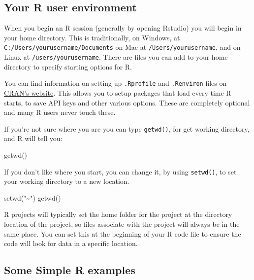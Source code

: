 \documentclass[
]{article}
\newenvironment{Shaded}{\begin{snugshade}}{\end{snugshade}}
\newcommand{\FunctionTok}[1]{\textcolor[rgb]{0.00,0.00,0.00}{#1}}
\newcommand{\NormalTok}[1]{#1}
\newcommand{\StringTok}[1]{\textcolor[rgb]{0.31,0.60,0.02}{#1}}
\begin{document}
\hypertarget{your-r-user-environment}{%
\subsection{Your R user environment}\label{your-r-user-environment}}

When you begin an R session (generally by opening Rstudio) you will
begin in your home directory. This is traditionally, on Windows, at
\texttt{\textquotesingle{}C:/Users/yourusername/Documents\textquotesingle{}} on Mac at \texttt{\textquotesingle{}/Users/yourusername\textquotesingle{}},
and on Linux at \texttt{\textquotesingle{}/users/yourusername\textquotesingle{}}. There are files you can add to
your home directory to specify starting options for R.

You can find information on setting up \texttt{.Rprofile} and \texttt{.Renviron} files
on \href{https://cran.r-project.org/web/packages/startup/vignettes/startup-intro.html}{CRAN's
website}.
This allows you to setup packages that load every time R starts, to save
API keys and other various options. These are completely optional and
many R users never touch these.

If you're not sure where you are you can type \texttt{getwd()}, for get working
directory, and R will tell you:

\begin{Shaded}
\begin{Highlighting}[]
\FunctionTok{getwd}\NormalTok{()}
\end{Highlighting}
\end{Shaded}

If you don't like where you start, you can change it, by using
\texttt{setwd()}, to set your working directory to a new location.

\begin{Shaded}
\begin{Highlighting}[]
\FunctionTok{setwd}\NormalTok{(}\StringTok{"\textasciitilde{}"}\NormalTok{)}
\FunctionTok{getwd}\NormalTok{()}
\end{Highlighting}
\end{Shaded}

R projects will typically set the home folder for the project at the
directory location of the project, so files associate with the project
will always be in the same place. You can set this at the beginning of
your R code file to ensure the code will look for data in a specific
location.

\hypertarget{some-simple-r-examples}{%
\subsection{Some Simple R examples}\label{some-simple-r-examples}}
\end{document}
